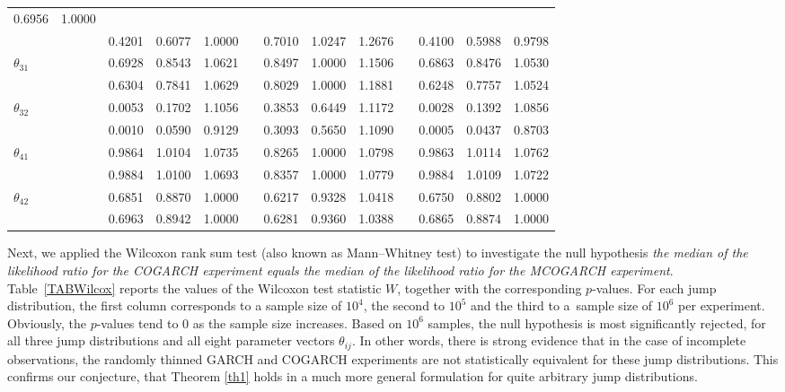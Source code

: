 \documentclass[number,citesort,seceqn,dvips]{arxbj}
\begin{document}
\begin{table}
\begin{tabular*}{\textwidth}{@{\extracolsep{\fill}}l@{}l@{}lll@{}l@{}lll@{}l@{}lll@{}}
0.6956 &1.0000 \\
&& 0.4201 &0.6077 &1.0000 && 0.7010& 1.0247 &1.2676 && 0.4100& 0.5988& 0.9798 \\
[3pt]
$\theta_{31}$ && 0.6928 &0.8543 &1.0621 && 0.8497& 1.0000 &1.1506 && 0.6863&
0.8476 &1.0530 \\
&& 0.6304 &0.7841 &1.0629 && 0.8029& 1.0000& 1.1881 && 0.6248& 0.7757& 1.0524 \\
[3pt]
$\theta_{32}$ && 0.0053 &0.1702 &1.1056 && 0.3853 &0.6449 &1.1172 && 0.0028&
0.1392 &1.0856 \\
&& 0.0010 &0.0590 &0.9129 && 0.3093& 0.5650& 1.1090 && 0.0005& 0.0437& 0.8703 \\
[3pt]
$\theta_{41}$ && 0.9864& 1.0104 &1.0735 && 0.8265& 1.0000& 1.0798 && 0.9863&
1.0114& 1.0762 \\
&& 0.9884 &1.0100& 1.0693 && 0.8357 &1.0000 &1.0779 && 0.9884 &1.0109 &1.0722 \\
[3pt]
$\theta_{42}$ && 0.6851& 0.8870 &1.0000 && 0.6217& 0.9328 &1.0418 && 0.6750&
0.8802& 1.0000 \\
&& 0.6963& 0.8942& 1.0000 && 0.6281 &0.9360 &1.0388 && 0.6865 &0.8874& 1.0000 \\
\hline
\end{tabular*}
%
\end{table}
%


Next, we applied the Wilcoxon rank sum test (also known as
Mann--Whitney test) to investigate the null hypothesis \textit{the median
of the likelihood ratio for the COGARCH experiment equals the median of
the likelihood ratio for the MCOGARCH experiment}. Table~\ref{TABWilcox} reports the values of the Wilcoxon test statistic $W$,
together with the corresponding $p$-values. For each jump distribution,
the first column corresponds to a sample size of $10^4$, the second to
$10^5$ and the third to a~sample size of $10^6$ per experiment.
Obviously, the $p$-values tend to 0 as the sample size increases. Based
on $10^6$ samples, the null hypothesis is most significantly rejected,
for all three jump distributions and all eight parameter vectors
$\theta_{ij}$. In other words, there is strong evidence that in the
case of incomplete observations, the randomly thinned GARCH and
COGARCH experiments are not statistically equivalent for these jump
distributions. This confirms our conjecture, that Theorem \ref{th1}
holds in a much more general formulation for quite arbitrary jump
distributions.
\end{document}
